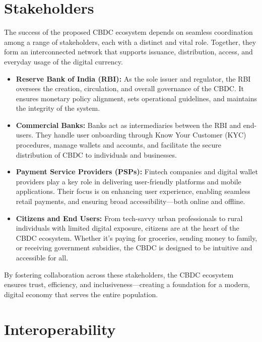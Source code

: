 \section{Stakeholders}

The success of the proposed CBDC ecosystem depends on seamless coordination among a range of stakeholders, each with a distinct and vital role. Together, they form an interconnected network that supports issuance, distribution, access, and everyday usage of the digital currency.

\begin{itemize}
    \item \textbf{Reserve Bank of India (RBI):}  
    As the sole issuer and regulator, the RBI oversees the creation, circulation, and overall governance of the CBDC. It ensures monetary policy alignment, sets operational guidelines, and maintains the integrity of the system.

    \item \textbf{Commercial Banks:}  
    Banks act as intermediaries between the RBI and end-users. They handle user onboarding through Know Your Customer (KYC) procedures, manage wallets and accounts, and facilitate the secure distribution of CBDC to individuals and businesses.

    \item \textbf{Payment Service Providers (PSPs):}  
    Fintech companies and digital wallet providers play a key role in delivering user-friendly platforms and mobile applications. Their focus is on enhancing user experience, enabling seamless retail payments, and ensuring broad accessibility—both online and offline.

    \item \textbf{Citizens and End Users:}  
    From tech-savvy urban professionals to rural individuals with limited digital exposure, citizens are at the heart of the CBDC ecosystem. Whether it's paying for groceries, sending money to family, or receiving government subsidies, the CBDC is designed to be intuitive and accessible for all.
\end{itemize}

By fostering collaboration across these stakeholders, the CBDC ecosystem ensures trust, efficiency, and inclusiveness—creating a foundation for a modern, digital economy that serves the entire population.

\section{Interoperability}

